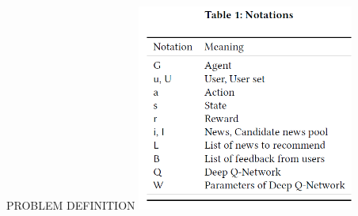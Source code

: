  
 \begin{frame}{PROBLEM DEFINITION}
\includegraphics[height=6.8cm]{figure 3.png}
\centering
\end{frame}




